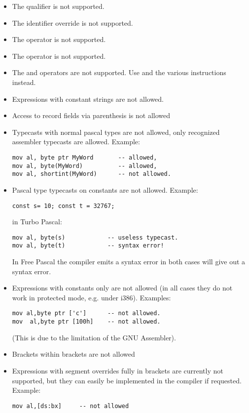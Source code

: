 \begin{itemize}
\item The  qualifier is not supported.
\item The \var{\&} identifier override is not supported.
\item The  operator is not supported.
\item The  operator is not supported.
\item The  and  operators are not supported.
      Use  and the various  instructions instead.
\item Expressions with constant strings are not allowed.
\item Access to record fields via parenthesis is not allowed
\item Typecasts with normal pascal types are not allowed, only
    recognized assembler typecasts are allowed. Example:
\begin{verbatim}
mov al, byte ptr MyWord       -- allowed,
mov al, byte(MyWord)          -- allowed,
mov al, shortint(MyWord)      -- not allowed.
\end{verbatim}
\item Pascal type typecasts on constants are not allowed.
Example:
\begin{verbatim}
const s= 10; const t = 32767;
\end{verbatim}
in Turbo Pascal:
\begin{verbatim}
mov al, byte(s)            -- useless typecast.
mov al, byte(t)            -- syntax error!
\end{verbatim}
In Free Pascal the compiler emits a syntax error in both cases will give out a syntax error.
\item Expressions with constants only are not allowed (in all cases they do not work in protected mode,
   e.g. under \linux i386). Examples:
\begin{verbatim}
mov al,byte ptr ['c']      -- not allowed.
mov  al,byte ptr [100h]    -- not allowed.
\end{verbatim}
 (This is due to the limitation of the GNU Assembler).
\item Brackets within brackets are not allowed
\item Expressions with segment overrides fully in brackets are
currently not supported, but they can easily be implemented
in the compiler if requested. Example:
\begin{verbatim}
mov al,[ds:bx]     -- not allowed
\end{verbatim}

\end{itemize}

